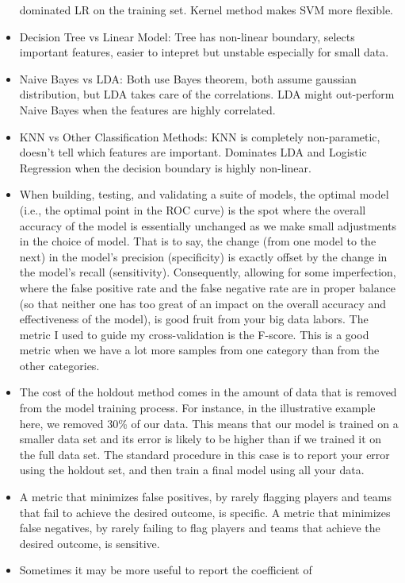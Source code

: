 \documentclass[]{book}
\begin{document}
\begin{itemize}
  dominated LR on the training set. Kernel method makes SVM more
  flexible.
\item
  Decision Tree vs Linear Model: Tree has non-linear boundary, selects
  important features, easier to intepret but unstable especially for
  small data.
\item
  Naive Bayes vs LDA: Both use Bayes theorem, both assume gaussian
  distribution, but LDA takes care of the correlations. LDA might
  out-perform Naive Bayes when the features are highly correlated.
\item
  KNN vs Other Classification Methods: KNN is completely non-parametic,
  doesn't tell which features are important. Dominates LDA and Logistic
  Regression when the decision boundary is highly non-linear.
\item
  When building, testing, and validating a suite of models, the optimal
  model (i.e., the optimal point in the ROC curve) is the spot where the
  overall accuracy of the model is essentially unchanged as we make
  small adjustments in the choice of model. That is to say, the change
  (from one model to the next) in the model's precision (specificity) is
  exactly offset by the change in the model's recall (sensitivity).
  Consequently, allowing for some imperfection, where the false positive
  rate and the false negative rate are in proper balance (so that
  neither one has too great of an impact on the overall accuracy and
  effectiveness of the model), is good fruit from your big data labors.
  The metric I used to guide my cross-validation is the F-score. This is
  a good metric when we have a lot more samples from one category than
  from the other categories.
\item
  The cost of the holdout method comes in the amount of data that is
  removed from the model training process. For instance, in the
  illustrative example here, we removed 30\% of our data. This means
  that our model is trained on a smaller data set and its error is
  likely to be higher than if we trained it on the full data set. The
  standard procedure in this case is to report your error using the
  holdout set, and then train a final model using all your data.
\item
  A metric that minimizes false positives, by rarely flagging players
  and teams that fail to achieve the desired outcome, is specific. A
  metric that minimizes false negatives, by rarely failing to flag
  players and teams that achieve the desired outcome, is sensitive.
\item
  Sometimes it may be more useful to report the coefficient of

\end{itemize}
\end{document}
